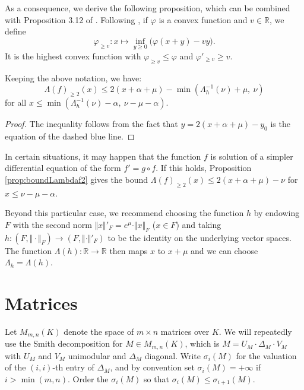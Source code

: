 \documentclass{sig-alternate-2013}
\newcommand{\R}{\mathbb R}
\begin{document}
As a consequence, we derive the following 
proposition, which can be combined with Proposition 3.12 of 
\cite{caruso-roe-vaccon:14a}. Following \cite{caruso-roe-vaccon:14a},
if $\varphi$ is a convex function and $v \in \R$, we define
$$\varphi_{\geq v} : x \mapsto \inf_{y \geq 0} \big( \varphi(x+y)
- vy \big).$$
It is the highest convex function with $\varphi_{\geq v} \leq \varphi$ and 
$\varphi'_{\geq v} \geq v$.

\begin{prop}
\label{prop:boundLambdaf2}
Keeping the above notation, we have:
$$\Lambda(f)_{\geq 2} (x) \leq 2(x + \alpha + \mu) -
\min(\Lambda_h^{-1}(\nu) + \mu, \: \nu)$$
for all $x \leq \min(\Lambda_h^{-1}(\nu) - \alpha, \: \nu - \mu - \alpha)$.
\end{prop}

\begin{proof}
The inequality follows from the fact that $y = 2(x + \alpha + \mu) - y_0$ is the equation of 
the dashed blue line.
\end{proof}

\begin{rem}
In certain situations,
it may happen that the function $f$ is solution of a simpler 
differential equation of the form $f' = g \circ f$. If this holds, 
Proposition \ref{prop:boundLambdaf2} gives the bound $\Lambda(f)_{\geq 
2} (x) \leq 2(x + \alpha + \mu) - \nu$ for $x \leq \nu - \mu - \alpha$.

Beyond this particular case, we recommend choosing the 
function $h$ by endowing $F$ with the second norm $\Vert x \Vert'_F = 
e^\mu \cdot \Vert x \Vert_F$ ($x \in F$) and taking $h : (F, \Vert 
\cdot \Vert_F) \to (F, \Vert \cdot \Vert'_F)$ to be the identity on the
underlying vector spaces. The function $\Lambda(h) : \R \to \R$ then maps $x$ to $x + 
\mu$ and we can choose $\Lambda_h = \Lambda(h)$.
\end{rem}

\section{Matrices}
\label{sec:matrices}

Let $M_{m,n}(K)$ denote the space of $m \times n$ matrices over $K$.  
We will repeatedly use the Smith decomposition for $M \in M_{m,n}(K)$,
which is $M = U_M \cdot \Delta_M \cdot V_M$
with $U_M$ and $V_M$ unimodular and $\Delta_M$ diagonal.  Write $\sigma_i(M)$
for the valuation of the $(i,i)$-th entry of $\Delta_M$, and by convention set
$\sigma_i(M) = +\infty$ if $i > \min(m,n)$.  Order the $\sigma_i(M)$ so that $\sigma_i(M) \le \sigma_{i+1}(M)$.
\end{document}
